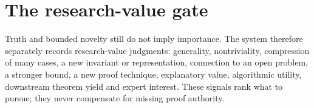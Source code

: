 \section{The research-value gate}

Truth and bounded novelty still do not imply importance. The system therefore separately records research-value judgments: generality, nontriviality, compression of many cases, a new invariant or representation, connection to an open problem, a stronger bound, a new proof technique, explanatory value, algorithmic utility, downstream theorem yield and expert interest. These signals rank what to pursue; they never compensate for missing proof authority.
